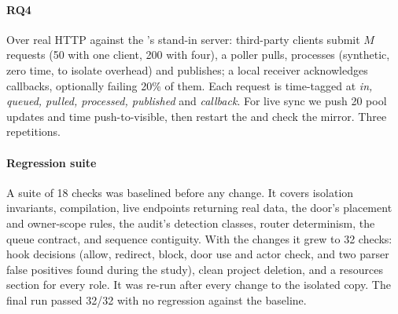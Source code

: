 \paragraph*{RQ4} Over real HTTP against the \hub's stand-in server: third-party clients submit $M$ requests (50 with one client, 200 with four), a poller pulls, processes (synthetic, zero time, to isolate overhead) and publishes; a local receiver acknowledges callbacks, optionally failing 20\% of them. Each request is time-tagged at \emph{in, queued, pulled, processed, published} and \emph{callback}. For live sync we push 20 pool updates and time push-to-visible, then restart the \hub{} and check the mirror. Three repetitions.

\paragraph*{Regression suite} A suite of 18 checks was baselined before any change. It covers isolation invariants, compilation, live endpoints returning real data, the door's placement and owner-scope rules, the audit's detection classes, router determinism, the queue contract, and sequence contiguity. With the changes it grew to 32 checks: hook decisions (allow, redirect, block, door use and actor check, and two parser false positives found during the study), clean project deletion, and a resources section for every role. It was re-run after every change to the isolated copy. The final run passed 32/32 with no regression against the baseline.
